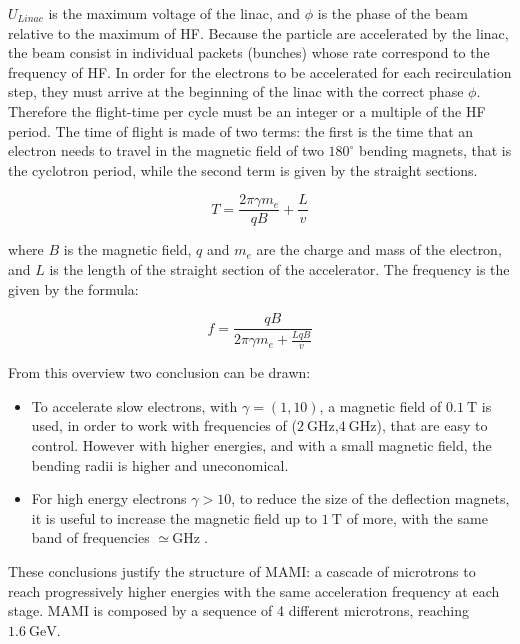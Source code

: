 $U_{Linac}$ is the maximum voltage of the linac, and $\phi$ is the phase of the beam relative to the maximum of HF. Because the particle are accelerated by the linac, the beam consist in individual packets (bunches) whose rate correspond to the frequency of HF. In order for the electrons to be accelerated for each recirculation step, they must arrive at the beginning of the linac with the correct phase $\phi$. Therefore the flight-time per cycle must be an integer or a multiple of the HF period. The time of flight is made of two terms: the first is the time that an electron needs to travel in the magnetic field of two $180^{\circ}$ bending magnets, that is the cyclotron period, while the second term is given by the straight sections. 

\begin{equation} \label{eq:TimeofFlight}
T = \dfrac{2 \pi \gamma m_{e} }{qB} + \dfrac{L}{v}
\end{equation}

where $B$ is the magnetic field, $q$ and $m_{e}$ are the charge and mass of the electron, and $L$ is the length of the straight section of the accelerator. The frequency is the given by the formula:

\begin{equation} \label{eq:frequency}
f = \dfrac{qB}{2 \pi \gamma m_{e} + \frac{LqB}{v}} 
\end{equation}

From this overview two conclusion can be drawn:

\begin{itemize}
\item To accelerate slow electrons, with $\gamma = (1,10)$, a magnetic field of $\SI{0.1}{\tesla}$ is used, in order to work with frequencies of ($\SI{2}{\giga \hertz}$,$\SI{4}{\giga \hertz}$), that are easy to control. However with higher energies, and with a small magnetic field, the bending radii is higher and uneconomical.
\item For high energy electrons $\gamma > 10$, to reduce the size of the deflection magnets, it is useful to increase the magnetic field up to $\SI{1}{\tesla}$ of more, with the same band of frequencies $\simeq \SI{}{\giga \hertz}$.
\end{itemize}

These conclusions justify the structure of MAMI: a cascade of microtrons to reach progressively higher energies with the same acceleration frequency at each stage. MAMI is composed by a sequence of 4 different microtrons, reaching $\SI{1.6}{\giga \electronvolt}$. 

